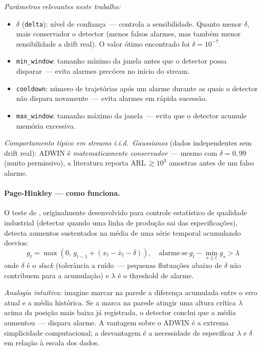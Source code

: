 \documentclass[11pt,a4paper]{article}
\begin{document}
\emph{Par\^ametros relevantes neste trabalho:}
\begin{itemize}[leftmargin=1.4em,itemsep=1pt]
    \item $\delta$ (\texttt{delta}): n\'ivel de confian\c{c}a~--- controla a sensibilidade. Quanto menor $\delta$, mais conservador o detector (menos falsos alarmes, mas tamb\'em menor sensibilidade a drift real). O valor \'otimo encontrado foi $\delta = 10^{-7}$.
    \item \texttt{min\_window}: tamanho m\'inimo da janela antes que o detector possa disparar~--- evita alarmes prec\'oces no in\'icio do stream.
    \item \texttt{cooldown}: n\'umero de trajet\'orias ap\'os um alarme durante as quais o detector n\~ao dispara novamente~--- evita alarmes em r\'apida sucess\~ao.
    \item \texttt{max\_window}: tamanho m\'aximo da janela~--- evita que o detector acumule mem\'oria excessiva.
\end{itemize}

\emph{Comportamento t\'ipico em streams i.i.d.\ Gaussianos} (dados independentes sem drift real): ADWIN \'e \emph{matematicamente conservador}~--- mesmo com $\delta\!=\!0{,}99$ (muito permissivo), a literatura \cite{lu2019,gama2014} reporta ARL\,$\gtrsim\!10^3$ amostras antes de um falso alarme.

\paragraph{Page-Hinkley --- como funciona.}
O teste de \citet{page_hinkley}, originalmente desenvolvido para controle estat\'istico de qualidade industrial (detectar quando uma linha de produ\c{c}\~ao sai das especifica\c{c}\~oes), detecta aumentos sustentados na m\'edia de uma s\'erie temporal acumulando desvios:
\[
g_t = \max\left(0,\, g_{t-1} + (x_t - \bar{x}_t - \delta)\right),\quad
\mathrm{alarme\ se\ } g_t - \min_{s\leq t} g_s > \lambda
\]
onde $\delta$ \'e o \emph{slack} (toler\^ancia a ru\'ido~--- pequenas flutua\c{c}\~oes abaixo de $\delta$ n\~ao contribuem para a acumula\c{c}\~ao) e $\lambda$ \'e o threshold de alarme.

\emph{Analogia intuitiva:} imagine marcar na parede a diferen\c{c}a acumulada entre o erro atual e a m\'edia hist\'orica. Se a marca na parede atingir uma altura cr\'itica $\lambda$ acima da posi\c{c}\~ao mais baixa j\'a registrada, o detector conclui que a m\'edia aumentou~--- dispara alarme. A vantagem sobre o ADWIN \'e a extrema simplicidade computacional; a desvantagem \'e a necessidade de especificar $\lambda$ e $\delta$ em rela\c{c}\~ao \`a escala dos dados.
\end{document}
